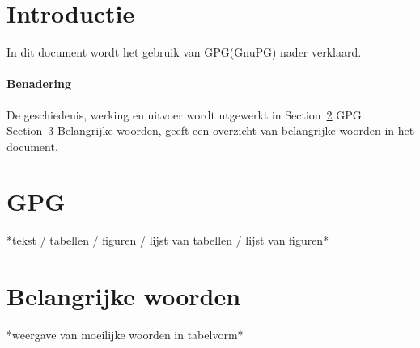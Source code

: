 \documentclass[12pt]{article}
\begin{document}
\maketitle
\newpage
\tableofcontents
\newpage

\section{Introductie}
In dit document wordt het gebruik van GPG(GnuPG) nader verklaard.

\paragraph{Benadering}
De geschiedenis, werking en uitvoer wordt utgewerkt in Section~\ref{GPG} GPG.\\
Section~\ref{Belangrijke woorden} Belangrijke woorden, geeft een overzicht van belangrijke woorden in het document.

\section{GPG}\label{GPG}
*tekst / tabellen / figuren / lijst van tabellen / lijst van figuren*

\section{Belangrijke woorden}\label{Belangrijke woorden}
*weergave van moeilijke woorden in tabelvorm*



\end{document}
